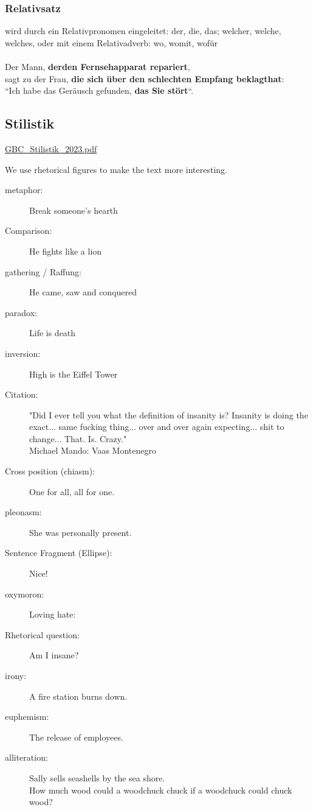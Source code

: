 \subsubsection{Relativsatz}

wird durch ein Relativpronomen eingeleitet: der, die, das; welcher, welche, welches, oder mit einem Relativadverb: wo, womit, wofür\\
\\
Der Mann, \textbf{derden Fernsehapparat repariert},\\
sagt zu der Frau, \textbf{die sich über den schlechten Empfang beklagthat}:\\
“Ich habe das Geräusch gefunden, \textbf{das Sie stört}“. 

\subsection{Stilistik}

\href{run:./includes/german/GBC/GBC_Stilistik_2023.pdf}{GBC\_Stilistik\_2023.pdf}

We use rhetorical figures to make the text more interesting.

\begin{description}
    \item[metaphor:] Break someone's hearth
    \item[Comparison:] He fights like a lion
    \item[gathering / Raffung:] He came, saw and conquered
    \item[paradox:] Life is death
    \item[inversion:] High is the Eiffel Tower
    \item[Citation:] "Did I ever tell you what the definition of insanity is? Insanity is doing the exact... same fucking thing... over and over again expecting... shit to change... That. Is. Crazy."\\ Michael Mando: Vaas Montenegro 
    \item[Cross position (chiasm):] One for all, all for one.
    \item[pleonasm:] She was personally present.
    \item[Sentence Fragment (Ellipse):] Nice!
    \item[oxymoron:] Loving hate:
    \item[Rhetorical question:] Am I insane?
    \item[irony:] A fire station burns down.
    \item[euphemism:] The release of employees.
    \item[alliteration:] Sally sells seashells by the sea shore.\\ How much wood could a woodchuck chuck if a woodchuck could chuck wood?
\end{description}